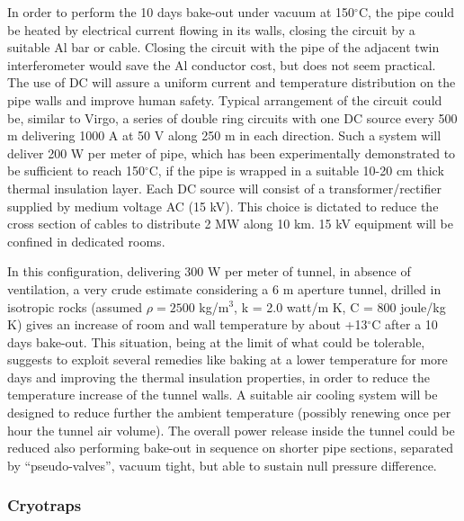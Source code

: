 In order to perform the 10 days bake-out under vacuum at 150$^{\circ}$C, the pipe could be heated by electrical current flowing in its walls, closing the circuit by a suitable Al bar or cable. Closing the circuit with the pipe of the adjacent twin interferometer would save the Al conductor cost, but does not seem practical. The use of DC will assure a uniform current and temperature distribution on the pipe walls and improve human safety. Typical arrangement of the circuit could be, similar to Virgo, a series of double ring circuits with one DC source every 500 m delivering 1000 A at 50 V along 250 m in each direction. Such a system will deliver 200 W per meter of pipe, which has been experimentally demonstrated to be sufficient to reach 150$^{\circ}$C, if the pipe is wrapped in a suitable 10-20 cm thick thermal insulation layer. Each DC source will consist of a transformer/rectifier supplied by medium voltage AC (15 kV). This choice is dictated to reduce the cross section of cables to distribute 2 MW along 10 km. 15 kV equipment will be confined in dedicated rooms.

In this configuration, delivering 300 W per meter of tunnel, in absence of ventilation, a very crude estimate considering a 6 m aperture tunnel, drilled in isotropic rocks (assumed  $\rho = 2500$ kg/m$^{3}$, k = 2.0 watt/m K, C = 800 joule/kg K) gives an increase of room and wall temperature by about +13$^{\circ}$C after a 10 days bake-out. This situation, being at the limit of what could be tolerable, suggests to exploit several remedies like baking at a lower temperature for more days and improving the thermal insulation properties, in order to reduce the temperature increase of the tunnel walls. A suitable air cooling system will be designed to reduce further the ambient temperature (possibly renewing once per hour the tunnel air volume). The overall power release inside the tunnel could be reduced also performing bake-out in sequence on shorter pipe sections, separated by ``pseudo-valves'', vacuum tight, but able to sustain null pressure difference.

\subsubsection{Cryotraps}

